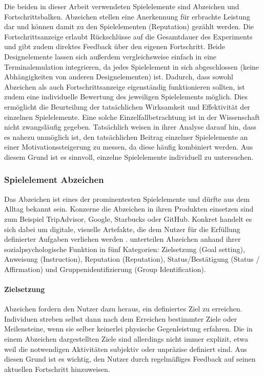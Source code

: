Die beiden in dieser Arbeit verwendeten Spielelemente sind Abzeichen und Fortschrittsbalken. Abzeichen stellen eine Anerkennung für erbrachte Leistung dar und können damit zu den  Spielelementen (Reputation) gezählt werden. Die Fortschrittsanzeige erlaubt Rückschlüsse auf die Gesamtdauer des Experiments und gibt zudem direktes Feedback über den eigenen Fortschritt. Beide Designelemente lassen sich außerdem vergleichsweise einfach in eine Terminalemulation integrieren, da jedes Spielelement in sich abgeschlossen (keine Abhängigkeiten von anderen Designelementen) ist. Dadurch, dass sowohl Abzeichen als auch Fortschrittsanzeige eigenständig funktionieren sollten, ist zudem eine individuelle Bewertung des jeweiligen Spielelements möglich. Dies ermöglicht die Beurteilung der tatsächlichen Wirksamkeit und Effektivität der einzelnen Spielelemente. Eine solche Einzelfallbetrachtung ist in der Wissenschaft nicht zwangsläufig gegeben. Tatsächlich weisen  in ihrer Analyse darauf hin, dass es nahezu unmöglich ist, den tatsächlichen Beitrag einzelner Spielelemente an einer Motivationssteigerung zu messen, da diese häufig kombiniert werden. Aus diesem Grund ist es sinnvoll, einzelne Spielelemente individuell zu untersuchen.


\subsubsection{Spielelement Abzeichen}\label{badge}
Das Abzeichen ist eines der prominentesten Spielelemente und dürfte aus dem Alltag bekannt sein. Konzerne die Abzeichen in ihren Produkten einsetzen sind zum Beispiel TripAdvisor, Google, Starbucks oder GitHub. Konkret handelt es sich dabei um digitale, visuelle Artefakte, die dem Nutzer für die Erfüllung definierter Aufgaben verliehen werden \cite{antin_badges_2011}. \citeauthor{antin_badges_2011} unterteilen Abzeichen anhand ihrer sozialpsychologische Funktion in fünf Kategorien: Zielsetzung (Goal setting), Anweisung (Instruction), Reputation (Reputation),
Status/Bestätigung (Status / Affirmation) und Gruppenidentifizierung (Group Identification). 


\paragraph{Zielsetzung}
Abzeichen fordern den Nutzer dazu heraus, ein definiertes Ziel zu erreichen. Individuen streben selbst dann nach dem Erreichen bestimmter Ziele oder Meilensteine, wenn sie selber keinerlei physische Gegenleistung erfahren. Die in einem Abzeichen dargestellten Ziele sind allerdings nicht immer explizit, etwa weil die notwendigen Aktivitäten subjektiv oder unpräzise definiert sind. Aus diesen Grund ist es wichtig, den Nutzer durch regelmäßiges Feedback auf seinen aktuellen Fortschritt hinzuweisen. 

